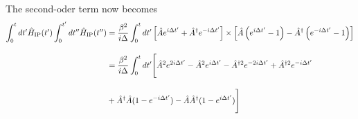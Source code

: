 The second-oder term now becomes
\begin{align}
    \int_0^{t}dt^\prime \hat{H}_{\rm{IP}}(t^\prime)
    \int_0^{t^\prime}dt^{\prime\prime} \hat{H}_{\rm{IP}}(t^{\prime\prime})
    &=\frac{\beta^2}{i\Delta}\int_0^{t}dt^\prime
    \left[
    \hat{A}e^{i\Delta t^\prime}
    +\hat{A}^\dagger e^{-i\Delta t^\prime}
    \right]
    \times
    \left[
    \hat{A}
    \left(e^{i\Delta t^\prime}-1\right)
    -\hat{A}^\dagger\left(e^{-i\Delta t^\prime}-1\right)
    \right]\nn[10pt]
    &=\frac{\beta^2}{i\Delta}\int_0^{t}dt^\prime
    \Biggl[
    \hat{A}^2e^{2i\Delta t^\prime}
    -\hat{A}^2e^{i\Delta t^\prime}
    -\hat{A}^{\dagger2}e^{-2i\Delta t^\prime}
    +\hat{A}^{\dagger2}e^{-i\Delta t^\prime}\nn[10pt]
    &
    +\hat{A}^{\dagger}\hat{A}(1-e^{-i\Delta t^\prime})
    -\hat{A}\hat{A}^{\dagger}(1-e^{i\Delta t^\prime})
    \Biggr]
\end{align}

